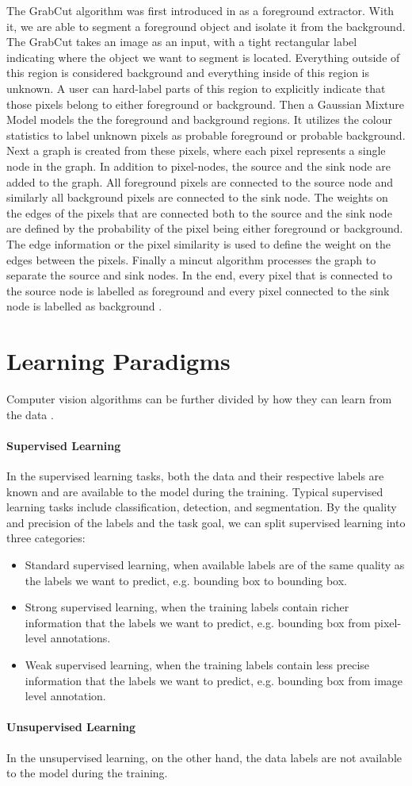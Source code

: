 The GrabCut algorithm was first introduced in \cite{Rother2004} as a foreground extractor. With it, we are able to segment a foreground object and isolate it from the background. The GrabCut takes an image as an input, with a tight rectangular label indicating where the object we want to segment is located. Everything outside of this region is considered background and everything inside of this region is unknown. A user can hard-label parts of this region to explicitly indicate that those pixels belong to either foreground or background. Then a Gaussian Mixture Model models the the foreground and background regions. It utilizes the colour statistics to label unknown pixels as probable foreground or probable background. Next a graph is created from these pixels, where each pixel represents a single node in the graph. In addition to pixel-nodes, the source and the sink node are added to the graph. All foreground pixels are connected to the source node and similarly all background pixels are connected to the sink node. The weights on the edges of the pixels that are connected both to the source and the sink node are defined by the probability of the pixel being either foreground or background. The edge information or the pixel similarity is used to define the weight on the edges between the pixels. Finally a mincut algorithm processes the graph to separate the source and sink nodes. In the end, every pixel that is connected to the source node is labelled as foreground and every pixel connected to the sink node is labelled as background \cite{opencv_grabcut}.


\section{Learning Paradigms}
Computer vision algorithms can be further divided by how they can learn from the data \cite{Alam2021}.

\paragraph{Supervised Learning} In the supervised learning tasks, both the data and their respective labels are known and are available to the model during the training. Typical supervised learning tasks include classification, detection, and segmentation. By the quality and precision of the labels and the task goal, we can split supervised learning into three categories:

\begin{itemize}
    \item Standard supervised learning, when available labels are of the same quality as the labels we want to predict, e.g. bounding box to bounding box.
    \item Strong supervised learning, when the training labels contain richer information that the labels we want to predict, e.g. bounding box from pixel-level annotations.
    \item Weak supervised learning, when the training labels contain less precise information that the labels we want to predict, e.g. bounding box from image level annotation.
\end{itemize}

\paragraph{Unsupervised Learning} In the unsupervised learning, on the other hand, the data labels are not available to the model during the training.

